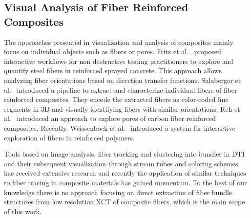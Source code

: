 \subsection {Visual Analysis of Fiber Reinforced Composites}
The approaches presented in visualization and analysis of composites mainly focus on individual objects such as fibers or pores. Fritz et al.~\cite{Fritz2009} proposed interactive workflows for non destructive testing practitioners to explore and quantify steel fibers in reinforced sprayed concrete. This approach allows analyzing fiber orientations based on direction transfer functions. Salaberger et al.~\cite{Salaberger2011} introduced a pipeline to extract and characterize individual fibers of fiber reinforced composites. They encode the extracted fibers as color-coded line segments in 3D and visually identifying fibers with similar orientations. Reh et al.~\cite{PMI_AR_2012} introduced an approach to explore pores of carbon fiber reinforced composites. Recently, Weissenbock et al.~\cite{Weissenbock2014} introduced a system for  interactive exploration of fibers in reinforced polymers. 


Tools based on image analysis, fiber tracking and clustering into bundles in DTI and their subsequent visualization through stream tubes and coloring schemes has received extensive research and recently the application of similar techniques to fiber tracing in composite materials has gained momentum. To the best of our knowledge there is no approach focusing on direct extraction of fiber bundle structures from low resolution XCT of composite fibers, which is the main scope of this work.




